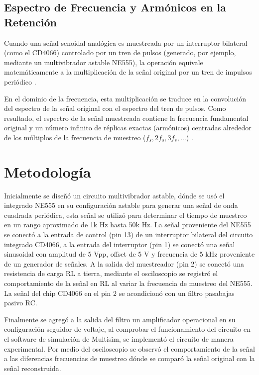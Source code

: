 \documentclass[conference]{IEEEtran}
\begin{document}
\subsection{Espectro de Frecuencia y Armónicos en la Retención}

Cuando una señal senoidal analógica es muestreada por un interruptor bilateral (como el CD4066) controlado por un tren de pulsos (generado, por ejemplo,
mediante un multivibrador astable NE555), la operación equivale matemáticamente a la multiplicación de la señal original por un tren de impulsos periódico \cite{ogata}.

En el dominio de la frecuencia, esta multiplicación se traduce en la convolución del espectro de la señal original con el espectro del tren de pulsos.
Como resultado, el espectro de la señal muestreada contiene la frecuencia fundamental original y un número infinito de réplicas exactas (armónicos) centradas alrededor de los múltiplos de la frecuencia de muestreo ($f_s, 2f_s, 3f_s, \dots$) \cite{alvarado}.

\section{Metodología}

 Inicialmente se diseñó un circuito multivibrador astable, dónde se usó 
el integrado NE555 en su configuración astable para generar una señal de onda cuadrada 
periódica, esta señal se utilizó para
determinar el tiempo de muestreo en un rango aproximado de 1k Hz hasta 50k Hz.
La señal proveniente del NE555 se conectó a la entrada de control (pin 13) de un interruptor bilateral 
del circuito integrado CD4066, a la entrada del interruptor (pin 1) se conectó 
una señal sinusoidal con amplitud de 5 Vpp, offset de 5 V y frecuencia de 5 kHz proveniente de un generador de señales. 
A la salida del muestreador (pin 2) se conectó una resistencia de carga RL a tierra,
mediante el osciloscopio se registró el comportamiento de la señal en RL
al variar la frecuencia de muestreo del NE555.
La señal del chip CD4066 en el pin 2 se acondicionó con un filtro pasabajas pasivo RC.

Finalmente se agregó a la salida del filtro un amplificador operacional en su configuración seguidor de voltaje,
al comprobar el funcionamiento del circuito en el software de simulación de Multisim, se implementó 
el circuito de manera experimental. Por medio del osciloscopio se observó el comportamiento de la señal a las diferencias frecuencias de muestreo
dónde se comparó la señal original con la señal reconstruida.  
\end{document}
